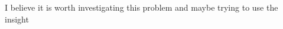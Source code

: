 \documentclass[
12pt, %
a4paper, %
onecolumn, %
]{article}
\begin{document}
I believe it is worth investigating this problem and maybe trying to use the insight


%

\renewcommand{\refname}{Bibliografia} %


\end{document}

